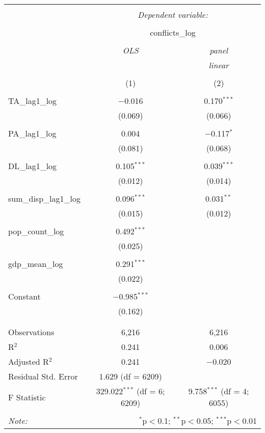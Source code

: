 
\begin{table}[!htbp] \centering 
  \caption{} 
  \label{} 
\begin{tabular}{@{\extracolsep{5pt}}lcc} 
\\[-1.8ex]\hline 
\hline \\[-1.8ex] 
 & \multicolumn{2}{c}{\textit{Dependent variable:}} \\ 
\cline{2-3} 
\\[-1.8ex] & \multicolumn{2}{c}{conflicts\_log} \\ 
\\[-1.8ex] & \textit{OLS} & \textit{panel} \\ 
 & \textit{} & \textit{linear} \\ 
\\[-1.8ex] & (1) & (2)\\ 
\hline \\[-1.8ex] 
 TA\_lag1\_log & $-$0.016 & 0.170$^{***}$ \\ 
  & (0.069) & (0.066) \\ 
  & & \\ 
 PA\_lag1\_log & 0.004 & $-$0.117$^{*}$ \\ 
  & (0.081) & (0.068) \\ 
  & & \\ 
 DL\_lag1\_log & 0.105$^{***}$ & 0.039$^{***}$ \\ 
  & (0.012) & (0.014) \\ 
  & & \\ 
 sum\_disp\_lag1\_log & 0.096$^{***}$ & 0.031$^{**}$ \\ 
  & (0.015) & (0.012) \\ 
  & & \\ 
 pop\_count\_log & 0.492$^{***}$ &  \\ 
  & (0.025) &  \\ 
  & & \\ 
 gdp\_mean\_log & 0.291$^{***}$ &  \\ 
  & (0.022) &  \\ 
  & & \\ 
 Constant & $-$0.985$^{***}$ &  \\ 
  & (0.162) &  \\ 
  & & \\ 
\hline \\[-1.8ex] 
Observations & 6,216 & 6,216 \\ 
R$^{2}$ & 0.241 & 0.006 \\ 
Adjusted R$^{2}$ & 0.241 & $-$0.020 \\ 
Residual Std. Error & 1.629 (df = 6209) &  \\ 
F Statistic & 329.022$^{***}$ (df = 6; 6209) & 9.758$^{***}$ (df = 4; 6055) \\ 
\hline 
\hline \\[-1.8ex] 
\textit{Note:}  & \multicolumn{2}{r}{$^{*}$p$<$0.1; $^{**}$p$<$0.05; $^{***}$p$<$0.01} \\ 
\end{tabular} 
\end{table} 
